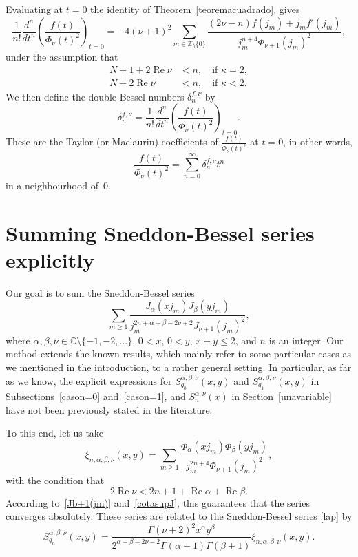 \documentclass[10pt,leqno,a4paper]{article}
\theoremstyle{plain}
\newcommand{\ZZ}{\mathbb{Z}}
\newcommand{\CC}{\mathbb{C}}
\renewcommand{\Re}{\operatorname{Re}}
\numberwithin{equation}{section}
\begin{document}
Evaluating at $t=0$ the identity of Theorem~\ref{teoremacuadrado}, gives
\begin{equation}
\label{evalt=0}
   \frac{1}{n!}
   \frac{d^n}{dt^n} \left( \frac{f(t)}{\Phi_\nu(t)^2} \right)_{t=0}
   = - 4(\nu+1)^2 \sum_{m \in \ZZ \setminus \{0\}}
   \frac{(2\nu-n) f(j_m) + j_m f'(j_m)}{j_m^{n+4} \Phi_{\nu+1}(j_m)^2},
\end{equation}
under the assumption that
\begin{align*}
   N + 1 + 2\Re \nu &< n, \quad \text{if } \kappa = 2,
   \\
   N + 2\Re \nu &< n, \quad \text{if } \kappa < 2.
\end{align*}
We then define the double Bessel numbers $\delta_n^{f,\nu}$ by
\[
   \delta_n^{f,\nu}
   = \frac{1}{n!}
   \frac{d^n}{dt^n} \left( \frac{f(t)}{\Phi_\nu(t)^2} \right)_{t=0}.
\]
These are the Taylor (or Maclaurin) coefficients of $\frac{f(t)}{\Phi_\nu(t)^2}$ at $t=0$, in other words,
\[
   \frac{f(t)}{\Phi_\nu(t)^2} = \sum_{n=0}^\infty \delta_n^{f,\nu}t^n
\]
in a neighbourhood of~$0$.

\section{Summing Sneddon-Bessel series explicitly}
\label{osf}

Our goal is to sum the Sneddon-Bessel series
\[
   \sum_{m\geq 1}
   \frac{J_{\alpha} (xj_m) J_{\beta}(yj_m)}
   {j_m^{2n+\alpha+\beta-2\nu+2} J_{\nu +1}(j_m)^2},
\]
where $\alpha, \beta,\nu \in \CC \setminus \{-1,-2,\dots\}$, $0 < x$, $0 < y$, $x+y\leq 2$, and $n$ is an integer. Our method extends the known results, which mainly refer to some particular cases as we mentioned in the introduction, to a rather general setting.
In particular, as far as we know, the explicit expressions for $S_{q_0}^{\alpha,\beta;\nu}(x,y)$ and $S_{q_1}^{\alpha,\beta;\nu}(x,y)$ in Subsections~\ref{cason=0} and~\ref{cason=1}, and $S_{n}^{\alpha;\nu}(x)$ in Section~\ref{unavariable} have not been previously stated in the literature.

To this end, let us take
\begin{equation}
\label{defxixy}
   \xi_{n,\alpha,\beta,\nu}(x,y)
   = \sum_{m\geq 1}
   \frac{\Phi_{\alpha}(xj_m) \Phi_{\beta}(yj_m)}{j_m^{2n+4} \Phi_{\nu +1}(j_m)^2},
\end{equation}
with the condition that
\begin{equation}
\label{rangooptimo}
   2 \Re \nu < 2n+1 + \Re \alpha + \Re \beta.
\end{equation}
According to~\eqref{Jb+1(jm)} and~\eqref{cotasupJ}, this guarantees that the series converges absolutely. These series are related to the Sneddon-Bessel series \eqref{lap} by
\begin{equation}
\label{lap2}
   S_{q_n}^{\alpha,\beta;\nu}(x,y)
   = \frac{\Gamma(\nu+2)^2 x^\alpha y^\beta}
   {2^{\alpha +\beta - 2\nu - 2} \Gamma(\alpha+1)\Gamma(\beta+1)}
   \xi_{n,\alpha,\beta,\nu}(x,y).
\end{equation}
\end{document}

